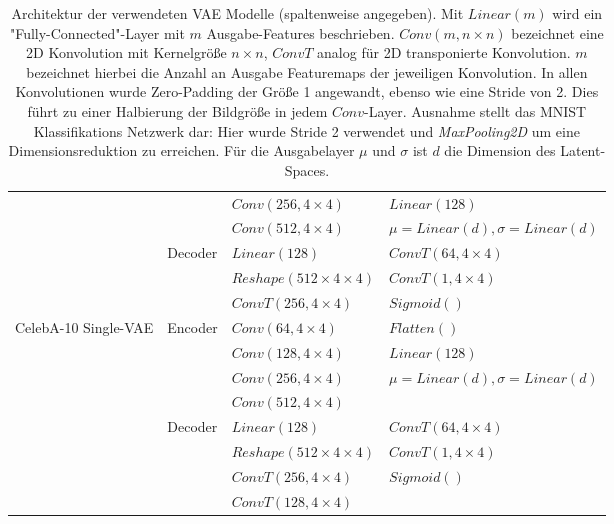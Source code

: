 \begin{table}[t]
{\begin{tabular}{l|l|ll}
                       &          & $Conv(256, 4 \times 4)$          & $Linear(128)$                         \\
                       &          & $Conv(512, 4 \times 4)$          & $\mu = Linear(d), \sigma = Linear(d)$ \\ \cline{2-4} 
                       & Decoder  & $Linear(128)$                    & $ConvT(64, 4 \times 4)$               \\
                       &          & $Reshape(512 \times 4 \times 4)$ & $ConvT(1, 4 \times 4)$                \\
                       &          & $ConvT(256, 4 \times 4)$         & $Sigmoid()$                           \\ \midrule
CelebA-10 Single-VAE   & Encoder  & $Conv(64, 4 \times 4)$           & $Flatten()$                           \\
                       &          & $Conv(128, 4 \times 4)$          & $Linear(128)$                         \\
                       &          & $Conv(256, 4 \times 4)$          & $\mu = Linear(d), \sigma = Linear(d)$ \\
                       &          & $Conv(512, 4 \times 4)$          &                                       \\ \cline{2-4} 
                       & Decoder  & $Linear(128)$                    & $ConvT(64, 4 \times 4)$               \\
                       &          & $Reshape(512 \times 4 \times 4)$ & $ConvT(1, 4 \times 4)$                \\
                       &          & $ConvT(256, 4 \times 4)$         & $Sigmoid()$                           \\
                       &          & $ConvT(128, 4 \times 4)$         &                                       \\
\bottomrule
\end{tabular}}
\caption{Architektur der verwendeten VAE Modelle (spaltenweise angegeben). Mit $Linear(m)$ wird ein "Fully-Connected"-Layer mit $m$ Ausgabe-Features beschrieben. $Conv(m, n \times n)$ bezeichnet eine 2D Konvolution mit Kernelgröße $n \times n$, $ConvT$ analog für 2D transponierte Konvolution. $m$ bezeichnet hierbei die Anzahl an Ausgabe Featuremaps der jeweiligen Konvolution. In allen Konvolutionen wurde Zero-Padding der Größe 1 angewandt, ebenso wie eine Stride von 2. Dies führt zu einer Halbierung der Bildgröße in jedem $Conv$-Layer. Ausnahme stellt das MNIST Klassifikations Netzwerk dar: Hier wurde Stride 2 verwendet und \textit{MaxPooling2D} um eine Dimensionsreduktion zu erreichen. Für die Ausgabelayer $\mu$ und $\sigma$ ist $d$ die Dimension des Latent-Spaces.}
\label{tab:vae_models}
\end{table}


